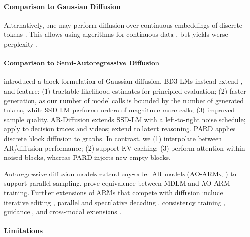 \documentclass{article} %
\def\algos{BD3-LMs}
\begin{document}
\paragraph{Comparison to Gaussian Diffusion} Alternatively, one may perform diffusion over continuous embeddings of discrete tokens \citep{li2022diffusion, dieleman2022continuous, chen2022analog}. This allows using algorithms for continuous data \citep{song2020denoising,ho2022classifier}, but yields worse perplexity \citep{graves2023bayesian,gulrajani2024plaid}.

\paragraph{Comparison to Semi-Autoregressive Diffusion}
\citet{han2022ssd,han2023ssd2} introduced a block formulation of Gaussian diffusion. \algos{} instead extend \citet{austin2021structured}, and feature: (1) tractable likelihood estimates for principled evaluation; (2) faster generation, as our number of model calls is bounded by the number of generated tokens, while SSD-LM performs orders of magnitude more calls; (3) improved sample quality. AR-Diffusion \citep{wu2023ardiffusion} extends SSD-LM with a left-to-right noise schedule; \citet{chen2025diffusion, ye2024diffusion} apply to decision traces and videos; \citet{hao2024training,kong2025scalable} extend to latent reasoning. PARD \citep{zhao2024pard} applies discrete block diffusion to graphs. In contrast, we (1) interpolate between AR/diffusion performance; (2) support KV caching; (3) perform attention within noised blocks, whereas PARD injects new empty blocks.

Autoregressive diffusion models \citep{hoogeboom2021argmax,hoogeboom2021autoregressive} extend any-order AR models (AO-ARMs; \citet{uria2014deep}) to support parallel sampling. \citet{zheng2024masked} prove equivalence between MDLM and AO-ARM training.
Further extensions of ARMs that compete with diffusion include iterative editing \citep{gu2019levenshtein}, parallel and speculative decoding \citep{gu2017non,santilli2023accelerating,cai2024medusa,gloeckle2024better}, consistency training \citep{kou2024cllms}, guidance \citep{sanchez2023stay}, and cross-modal extensions \citep{liu2023visual,tian2025visual}.

\paragraph{Limitations}
\end{document}
